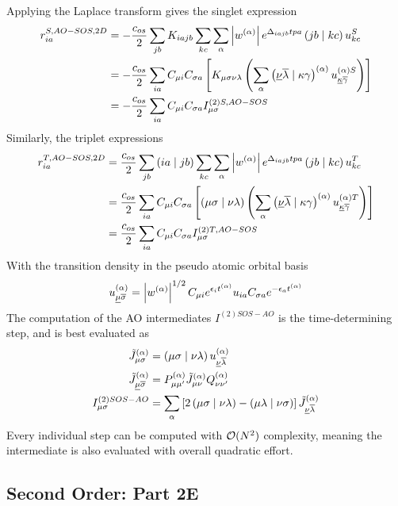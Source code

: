 \noindent Applying the Laplace transform gives the singlet expression
\begin{align}
\begin{split}
r_{ia}^{S,AO-SOS,2D} &= -\frac{c_{os}}{2} \sum_{jb} K_{iajb} \sum_{kc} \sum_{\alpha} \left\lvert w^{(\alpha)} \right\rvert e^{\Delta_{iajb}tpa} \left( jb \mid kc \right) u_{kc}^S \\
&= -\frac{c_{os}}{2} \sum_{ia} C_{\mu i} C_{\sigma a} \left[  K_{\mu\sigma\nu\lambda} \left( \sum_{\alpha} \left( \underline{\nu}\overline{\lambda} \mid \kappa\gamma \right)^{(\alpha)} u^{(\alpha)S}_{\underline{\kappa}\overline{\gamma}} \right)  \right] \\
&= -\frac{c_{os}}{2} \sum_{ia} C_{\mu i} C_{\sigma a} I^{(2)S,AO-SOS}_{\mu\sigma} 
\end{split} 
\end{align}
Similarly, the triplet expressions
\begin{align}
\begin{split}
r_{ia}^{T,AO-SOS,2D} &= \frac{c_{os}}{2} \sum_{jb} \left( ia \mid jb \right) \sum_{kc} \sum_{\alpha} \left\lvert w^{(\alpha)} \right\rvert e^{\Delta_{iajb}tpa} \left( jb \mid kc \right) u_{kc}^T \\
&= \frac{c_{os}}{2} \sum_{ia} C_{\mu i} C_{\sigma a} \left[  \left( \mu\sigma \mid \nu\lambda \right) \left( \sum_{\alpha} \left( \underline{\nu}\overline{\lambda} \mid \kappa\gamma \right)^{(\alpha)} u^{(\alpha)T}_{\underline{\kappa}\overline{\gamma}} \right) \right] \\
&= \frac{c_{os}}{2} \sum_{ia} C_{\mu i} C_{\sigma a} I^{(2)T,AO-SOS}_{\mu\sigma} 
\end{split}
\end{align}
\noindent With the transition density in the pseudo atomic orbital basis
\begin{equation}
u^{(\alpha)}_{\underline{\mu}\overline{\sigma}} = \left\lvert w^{(\alpha)} \right\rvert^{1/2} C_{\mu i} e^{\epsilon_i t^{(\alpha)}}  u_{ia} C_{\sigma a} e^{-\epsilon_a t^{(\alpha)}} 
\end{equation}
\noindent The computation of the AO intermediates $I^{(2)SOS-AO}$ is the time-determining step, and is best evaluated as
\begin{align}
\tilde{J}^{(\alpha)}_{\mu\sigma} &= \left( \mu\sigma \mid \nu\lambda \right) u^{(\alpha)}_{\underline{\nu}\overline{\lambda}} \\
\tilde{J}_{\underline{\mu}\overline{\sigma}}^{(\alpha)} &= P_{\mu\mu'}^{(\alpha)} \tilde{J}^{(\alpha)}_{\mu\nu} Q_{\nu\nu'}^{(\alpha)} \\
I^{(2)SOS-AO}_{\mu\sigma} &= \sum_{\alpha} \left[2 \left( \mu\sigma \mid \nu\lambda \right) - \left( \mu\lambda \mid \nu\sigma \right) \right] \tilde{J}_{\underline{\nu}\overline{\lambda}}^{(\alpha)}
\end{align}
\noindent Every individual step can be computed with $\mathcal{O}(N^{2})$ complexity, meaning the intermediate is also evaluated with overall quadratic effort.

\subsection{Second Order: Part 2E}

